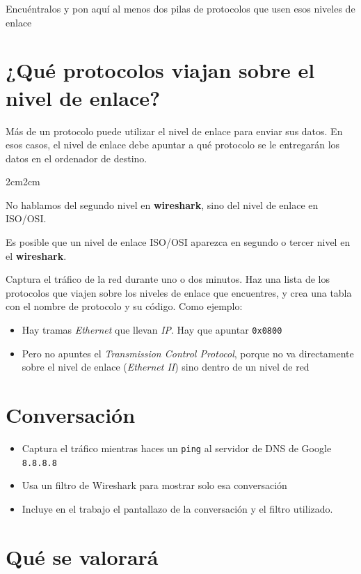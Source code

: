 \documentclass[a4paper]{article}
\begin{document}
Encuéntralos y pon aquí al menos dos pilas de protocolos que usen esos niveles de enlace
\section{¿Qué protocolos viajan sobre el nivel de enlace?}
\label{sec:org0000009}
Más de un protocolo puede utilizar el nivel de enlace para enviar sus datos. En esos casos, el nivel de enlace debe apuntar a qué protocolo se le entregarán los datos en el ordenador de destino.
\begin{adjustwidth}{2cm}{2cm}
\begin{Aviso}
No hablamos del segundo nivel en \textbf{wireshark}, sino del nivel de enlace en ISO/OSI.

Es posible que un nivel de enlace ISO/OSI aparezca en segundo o tercer nivel en el \textbf{wireshark}.
\end{Aviso}
\end{adjustwidth}

Captura el tráfico de la red durante uno o dos minutos. Haz una lista de los protocolos que viajen sobre los niveles de enlace que encuentres, y crea una tabla con el nombre de protocolo y su código. Como ejemplo:

\begin{itemize}
\item Hay tramas \emph{Ethernet} que llevan \emph{IP}. Hay que apuntar \texttt{0x0800}
\item Pero no apuntes el \emph{Transmission Control  Protocol}, porque no va directamente sobre el nivel de enlace (\emph{Ethernet II}) sino dentro de un nivel de red
\end{itemize}
\section{Conversación }
\label{sec:org000000c}

\begin{itemize}
\item Captura el tráfico mientras haces un \texttt{ping} al servidor de DNS de Google \texttt{8.8.8.8}
\item Usa un filtro de Wireshark para mostrar solo esa conversación
\item Incluye en el trabajo el pantallazo de la conversación y el filtro utilizado.
\end{itemize}
\section{Qué se valorará}
\label{sec:org000000f}
\end{document}
